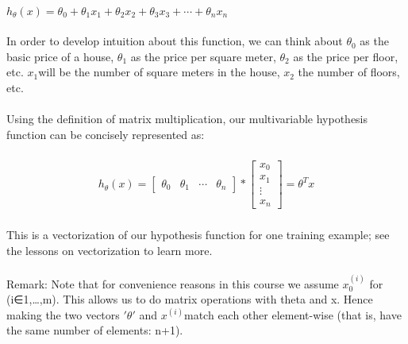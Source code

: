 \documentclass{article}
\begin{document}
\begin{CJK}{UTF8}{gbsn}
\paragraph{}
$h_{\theta}(x)=\theta_{0}+\theta_{1}x_{1}+\theta_{2}x_{2}+\theta_{3}x_{3}+\cdots+\theta_{n}x_{n}$
\paragraph{}
In order to develop intuition about this function, we can think about $\theta_{0}$ as the basic price of a house, $\theta_{1}$ as the price per square meter, $\theta_{2}$ as the price per floor, etc. $x_{1} $will be the number of square meters in the house, $x_{2}$ the number of floors, etc.
\paragraph{}
Using the definition of matrix multiplication, our multivariable hypothesis function can be concisely represented as:
\paragraph{}
\begin{algorithm} 
\begin{eqnarray*}
h_{\theta}(x)=\left[\begin{array}{cccc}
\theta_{0}&\theta_{1}&\cdots&\theta_{n}
\end{array}\right]*\left[\begin{array}{c}
x_{0}\\
x_{1}\\
\vdots\\
x_{n}
\end{array}\right]=\theta^{T}x
\end{eqnarray*}
\end{algorithm}
\paragraph{}
This is a vectorization of our hypothesis function for one training example; see the lessons on vectorization to learn more.
\paragraph{}
Remark: Note that for convenience reasons in this course we assume $ x_{0}^{(i)}$ for (i∈1,…,m). This allows us to do matrix operations with theta and x. Hence making the two vectors $'\theta'$ and $ x^{(i)} $match each other element-wise (that is, have the same number of elements: n+1).
\end{CJK}
\end{document}
